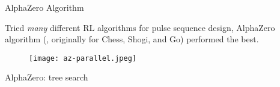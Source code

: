 \documentclass{beamer}
\begin{document}
\begin{frame}{AlphaZero Algorithm}

Tried \emph{many} different RL algorithms for pulse sequence design, AlphaZero algorithm (\cite{Silver1140}, originally for Chess, Shogi, and Go) performed the best.

\begin{figure}
\centering
\texttt{[image: az-parallel.jpeg]}
\end{figure}


\end{frame}



\begin{frame}[allowframebreaks]{AlphaZero: tree search}

% 

\begin{figure}
\centering
\scalebox{.6}{

}
\end{figure}

\begin{figure}
\centering
\scalebox{.6}{

}
\end{figure}

\begin{figure}
\centering
\scalebox{.6}{

}
\end{figure}

\begin{figure}
\centering
\scalebox{.6}{

}
\end{figure}

\begin{figure}
\centering
\scalebox{.6}{

}
\end{figure}



\end{frame}
\end{document}
